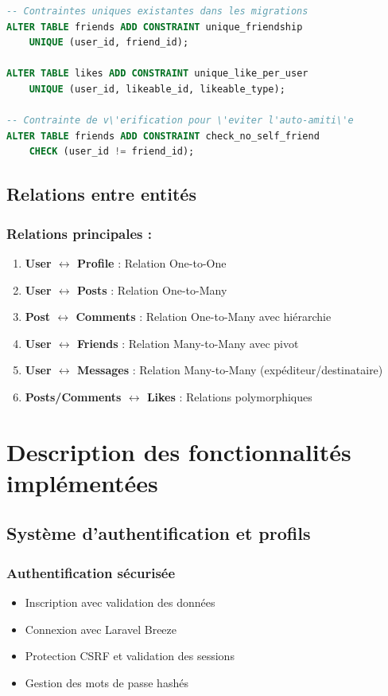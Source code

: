\documentclass[12pt,a4paper]{article}
\begin{document}
\begin{lstlisting}[language=SQL]
-- Contraintes uniques existantes dans les migrations
ALTER TABLE friends ADD CONSTRAINT unique_friendship 
    UNIQUE (user_id, friend_id);

ALTER TABLE likes ADD CONSTRAINT unique_like_per_user 
    UNIQUE (user_id, likeable_id, likeable_type);

-- Contrainte de v\'erification pour \'eviter l'auto-amiti\'e
ALTER TABLE friends ADD CONSTRAINT check_no_self_friend 
    CHECK (user_id != friend_id);
\end{lstlisting}

\subsection{Relations entre entit\'es}

\subsubsection{Relations principales :}

\begin{enumerate}
    \item \textbf{User $\leftrightarrow$ Profile} : Relation One-to-One
    \item \textbf{User $\leftrightarrow$ Posts} : Relation One-to-Many
    \item \textbf{Post $\leftrightarrow$ Comments} : Relation One-to-Many avec hi\'erarchie
    \item \textbf{User $\leftrightarrow$ Friends} : Relation Many-to-Many avec pivot
    \item \textbf{User $\leftrightarrow$ Messages} : Relation Many-to-Many (exp\'editeur/destinataire)
    \item \textbf{Posts/Comments $\leftrightarrow$ Likes} : Relations polymorphiques
\end{enumerate}

\section{Description des fonctionnalit\'es impl\'ement\'ees}

\subsection{Syst\`eme d'authentification et profils}

\subsubsection{Authentification s\'ecuris\'ee}
\begin{itemize}
    \item Inscription avec validation des donn\'ees
    \item Connexion avec Laravel Breeze
    \item Protection CSRF et validation des sessions
    \item Gestion des mots de passe hash\'es
\end{itemize}
\end{document}
